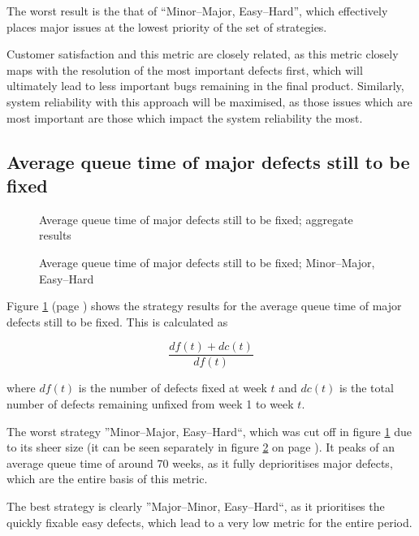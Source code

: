 \documentclass[a4paper,10pt]{article}
\begin{document}
The worst result is the that of ``Minor--Major, Easy--Hard'', which effectively places major issues at the lowest priority of the set of strategies.

Customer satisfaction and this metric are closely related, as this metric closely maps with the resolution of the most important defects first, which will ultimately lead to less important bugs remaining in the final product. Similarly, system reliability with this approach will be maximised, as those issues which are most important are those which impact the system reliability the most.

\subsection{Average queue time of major defects still to be fixed}
\begin{figure}
  \centering
  
  \caption{Average queue time of major defects still to be fixed; aggregate results}
  \label{agg:queuetime}
\end{figure}

\begin{figure}
  \centering
  
  \caption{Average queue time of major defects still to be fixed; Minor--Major, Easy--Hard}
  \label{agg:queuetime:mmeh}
\end{figure}

Figure \ref{agg:queuetime} (page \pageref{agg:queuetime}) shows the strategy results for the average queue time of major defects still to be fixed. This is calculated as

$$\frac{\mathit{df}(t) + \mathit{dc}(t)}{\mathit{df}(t)}$$

where $\mathit{df}(t)$ is the number of defects fixed at week $t$ and $\mathit{dc}(t)$ is the total number of defects remaining unfixed from week 1 to week $t$.

The worst strategy ''Minor--Major, Easy--Hard``, which was cut off in figure \ref{agg:queuetime} due to its sheer size (it can be seen separately in figure \ref{agg:queuetime:mmeh} on page \pageref{agg:queuetime:mmeh}). It peaks of an average queue time of around 70 weeks, as it fully deprioritises major defects, which are the entire basis of this metric.

The best strategy is clearly ''Major--Minor, Easy--Hard``, as it prioritises the quickly fixable easy defects, which lead to a very low metric for the entire period.
\end{document}
